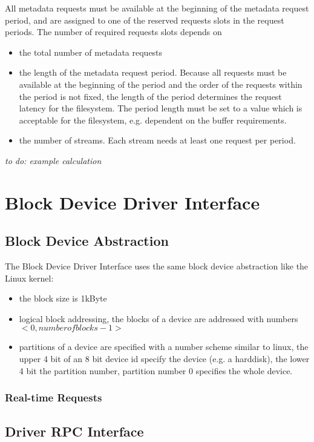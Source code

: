 \documentclass{article}
\begin{document}
All metadata requests must be available at the beginning of the metadata 
request period, and are assigned to one of the reserved requests slots in 
the request periods. The number of required requests slots depends on
\begin{itemize}
\item the total number of metadata requests
\item the length of the metadata request period. Because all requests must 
  be available at the beginning of the period and the order of the requests
  within the period is not fixed, the length of the period determines the 
  request latency for the filesystem. The period length must be set to 
  a value which is acceptable for the filesystem, e.g. dependent on the 
  buffer requirements.
\item the number of streams. Each stream needs at least one request per 
  period.
\end{itemize}

\emph{to do: example calculation}

\section{Block Device Driver Interface}

\subsection{Block Device Abstraction}

The Block Device Driver Interface uses the same block device abstraction 
like the Linux kernel:
\begin{itemize}
\item the block size is 1kByte
\item logical block addressing, the blocks of a device are addressed 
  with numbers $<0, number of blocks - 1>$
\item partitions of a device are specified with a number scheme similar to 
  linux, the upper 4 bit of an 8 bit device id specify the device 
  (e.g. a harddisk), the lower 4 bit the partition number, partition number
  0 specifies the whole device.
\end{itemize}

\subsubsection{Real-time Requests}

\subsection{Driver RPC Interface}
\end{document}

